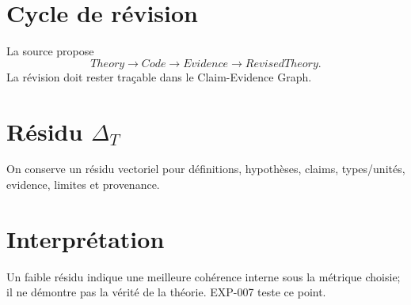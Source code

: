 \section{Cycle de révision}
La source propose
\[
Theory\to Code\to Evidence\to RevisedTheory.
\]
La révision doit rester traçable dans le Claim-Evidence Graph.

\section{Résidu $\Delta_T$}
On conserve un résidu vectoriel pour définitions, hypothèses, claims, types/unités, evidence, limites et provenance.

\section{Interprétation}
Un faible résidu indique une meilleure cohérence interne sous la métrique choisie; il ne démontre pas la vérité de la théorie. EXP-007 teste ce point.
